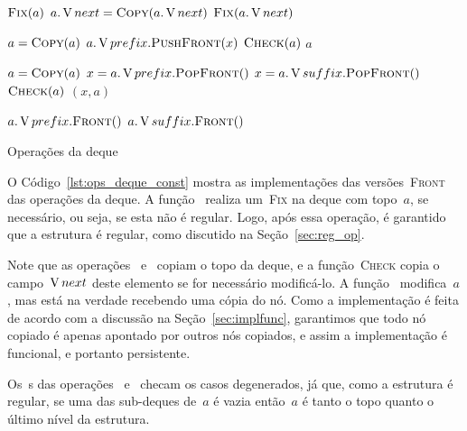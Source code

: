 \documentclass[main.tex]{subfiles}
\begin{document}
\begin{algorithm}
\begin{algorithmic}[1]

        \State $\Call{Fix}{a}$
        \State $a.\V{next} = \Call{Copy}{a.\V{next}}$
        \State $\Call{Fix}{a.\V{next}}$
    \EndIf
\EndFunction

    \State $a = \Call{Copy}{a}$
    \State $a.\V{prefix}.\Call{PushFront}{x}$
    \State $\Call{Check}{a}$
    \State \Return $a$
\EndFunction

    \State $a = \Call{Copy}{a}$
        \State $x = a.\V{prefix}.\Call{PopFront}{\null}$
    \Else
        \State $x = a.\V{suffix}.\Call{PopFront}{\null}$
    \EndIf
    \State $\Call{Check}{a}$
    \State \Return $(x, a)$
\EndFunction

        \State \Return $a.\V{prefix}.\Call{Front}{\null}$
    \Else
        \State \Return $a.\V{suffix}.\Call{Front}{\null}$
    \EndIf
\EndFunction

\end{algorithmic}
\caption{Operações da deque} \label{lst:ops_deque_const}
\end{algorithm}

O Código~\ref{lst:ops_deque_const} mostra as implementações das versões~\textsc{Front} das operações da deque. A função~ realiza um~\textsc{Fix} na deque com topo~$a$, se necessário, ou seja, se esta não é regular. Logo, após essa operação, é garantido que a estrutura é regular, como discutido na Seção~\ref{sec:reg_op}.

Note que as operações~ e~ copiam o topo da deque, e a função~\textsc{Check} copia o campo~$\operatorname{V}{next}$ deste elemento se for necessário modificá-lo. A função~ modifica~$a$, mas está na verdade recebendo uma cópia do nó. Como a implementação é feita de acordo com a discussão na Seção~\ref{sec:implfunc}, garantimos que todo nó copiado é apenas apontado por outros nós copiados, e assim a implementação é funcional, e portanto persistente.


Os~s das operações~ e~ checam os casos degenerados, já que, como a estrutura é regular, se uma das sub-deques de~$a$ é vazia então~$a$ é tanto o topo quanto o último nível da estrutura.
\end{document}
